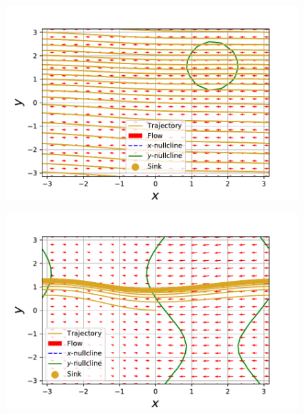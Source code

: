 \documentclass[../main]{subfiles}
\begin{document}
\begin{figure}[tbp]
    \begin{minipage}[b]{0.47\linewidth}
      \centering
      \includegraphics[keepaspectratio, scale=0.42]{images/phase_a4K2.pdf}
      \label{fig:phase-k2}
    \end{minipage}
    \begin{minipage}[b]{0.47\linewidth}
      \centering
      \includegraphics[keepaspectratio, scale=0.42]{images/phase_a4K10.pdf}
      \label{fig:phase-k10}
    \end{minipage}\\
    \begin{minipage}[b]{0.47\linewidth}
      \centering

\end{minipage}
\end{figure}
\end{document}
